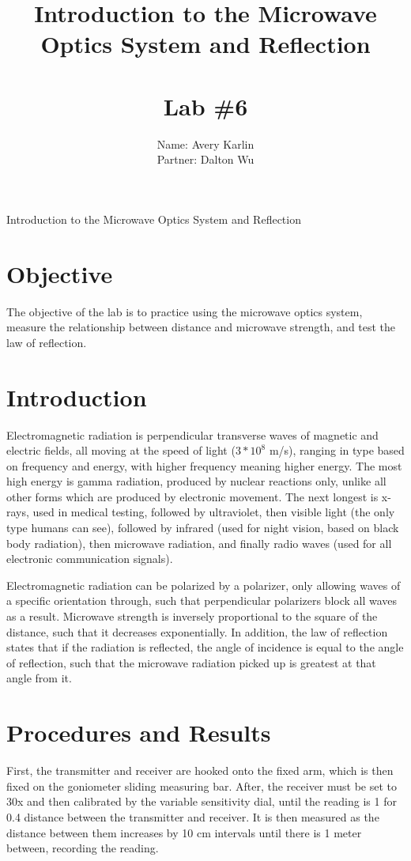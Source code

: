 \documentclass[11pt, titlepage]{article}
\title{Introduction to the Microwave Optics System and Reflection \\ \ \\ \large Lab \#6}
\author{Name: Avery Karlin \\ Partner: Dalton Wu}
\date{}
\begin{document}
\maketitle

\begin{center}
\LARGE Introduction to the Microwave Optics System and Reflection
\end{center}

\section*{Objective}
The objective of the lab is to practice using the microwave optics system, measure the relationship between distance and microwave strength, and test the law of reflection.

\section*{Introduction}
Electromagnetic radiation is perpendicular transverse waves of magnetic and electric fields, all moving at the speed of light ($3 * 10^8$ m/s), ranging in type based on frequency and energy, with higher frequency meaning higher energy. The most high energy is gamma radiation, produced by nuclear reactions only, unlike all other forms which are produced by electronic movement. The next longest is x-rays, used in medical testing, followed by ultraviolet, then visible light (the only type humans can see), followed by infrared (used for night vision, based on black body radiation), then microwave radiation, and finally radio waves (used for all electronic communication signals).

Electromagnetic radiation can be polarized by a polarizer, only allowing waves of a specific orientation through, such that perpendicular polarizers block all waves as a result. Microwave strength is inversely proportional to the square of the distance, such that it decreases exponentially. In addition, the law of reflection states that if the radiation is reflected, the angle of incidence is equal to the angle of reflection, such that the microwave radiation picked up is greatest at that angle from it.

\section*{Procedures and Results}

First, the transmitter and receiver are hooked onto the fixed arm, which is then fixed on the goniometer sliding measuring bar. After, the receiver must be set to 30x and then calibrated by the variable sensitivity dial, until the reading is 1 for 0.4 distance between the transmitter and receiver. It is then measured as the distance between them increases by 10 cm intervals until there is 1 meter between, recording the reading. 
\end{document}
